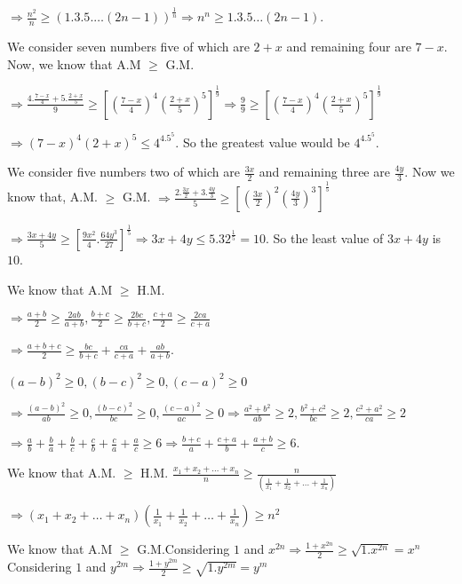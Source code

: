   $\Rightarrow \frac{n^2}{n}\geq (1.3.5.\ldots(2n - 1))^{\frac{1}{n}} \Rightarrow n^n \geq 1.3.5\ldots (2n - 1)$.
\item We consider seven numbers five of which are $2 + x$ and remaining four are $7 - x.$ Now, we know that A.M
  $\geq$ G.M.

  $\Rightarrow \frac{4.\frac{7 - x}{4} + 5.\frac{2 + x}{5}}{9}\geq \left[\left(\frac{7 - x}{4}\right)^4\left(\frac{2 +
    x}{5}\right)^5\right]^{\frac{1}{9}} \Rightarrow \frac{9}{9}\geq \left[\left(\frac{7 -
    x}{4}\right)^4\left(\frac{2 + x}{5}\right)^5\right]^{\frac{1}{9}}$

  $\Rightarrow (7 - x)^4(2 + x)^5 \leq 4^4.5^5$. So the greatest value would be $4^4.5^5$.
\item We consider five numbers two of which are $\frac{3x}{2}$ and remaining three are $\frac{4y}{3}.$ Now we know
  that, A.M. $\geq$ G.M.
  $\Rightarrow \frac{2.\frac{3x}{2} + 3.\frac{4y}{3}}{5}\geq
  \left[\left(\frac{3x}{2}\right)^2\left(\frac{4y}{3}\right)^3\right]^{\frac{1}{5}}$

  $\Rightarrow \frac{3x + 4y}{5}\geq \left[\frac{9x^2}{4}.\frac{64y^3}{27}\right]^{\frac{1}{5}} \Rightarrow
  3x + 4y \leq 5.{32}^{\frac{1}{5}} = 10$. So the least value of $3x + 4y$ is $10$.
\item We know that A.M $\geq$ H.M.

  $\Rightarrow \frac{a + b}{2}\geq \frac{2ab}{a + b}, \frac{b + c}{2}\geq \frac{2bc}{b + c}, \frac{c + a}{2}\geq
  \frac{2ca}{c + a}$

  $\Rightarrow \frac{a + b + c}{2}\geq \frac{bc}{b + c} + \frac{ca}{c + a} + \frac{ab}{a + b}$.
\item $(a - b)^2 \geq 0, (b - c)^2\geq 0, (c - a)^2\geq 0$

  $\Rightarrow \frac{(a - b)^2}{ab}\geq 0, \frac{(b - c)^2}{bc}\geq 0, \frac{(c - a)^2}{ac}\geq 0
  \Rightarrow \frac{a^2 + b^2}{ab}\geq 2, \frac{b^2 + c^2}{bc}\geq 2, \frac{c^2 + a^2}{ca}\geq 2$

  $\Rightarrow \frac{a}{b} + \frac{b}{a} + \frac{b}{c} + \frac{c}{b} + \frac{c}{a} + \frac{a}{c}\geq
  6\Rightarrow \frac{b + c}{a} + \frac{c + a}{b} + \frac{a + b}{c}\geq 6$.
\item We know that A.M. $\geq$ H.M.
  $\frac{x_1 + x_2 + \ldots + x_n}{n}\geq \frac{n}{\left(\frac{1}{x_1} + \frac{1}{x_2} + \ldots +
  \frac{1}{x_n}\right)}$

  $\Rightarrow (x_1 + x_2 + \ldots + x_n)\left(\frac{1}{x_1} + \frac{1}{x_2} +
  \ldots + \frac{1}{x_n}\right) \geq n^2$
\item We know that A.M $\geq$ G.M.Considering $1$ and $x^{2n}\Rightarrow \frac{1 + x^{2n}}{2}\geq \sqrt{1.x^{2n}} = x^n$
  Considering $1$ and $y^{2m}\Rightarrow \frac{1 + y^{2m}}{2}\geq \sqrt{1.y^{2m}} = y^m$

